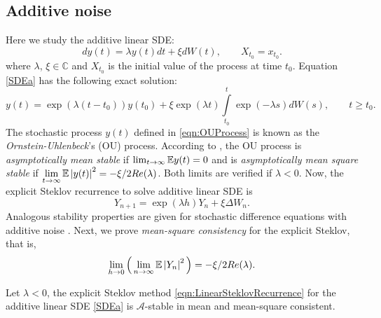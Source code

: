 		\subsection{Additive noise}
		Here we study the additive linear SDE: 
		\begin{equation}\label{SDEa}
			dy(t)=\lambda y(t)dt+ \xi  dW(t) , \qquad X_{t_0}=x_{t_0}.		
		\end{equation}
		where $\lambda$, $\xi \in \mathbb{C}$ and $X_{t_0}$ is the initial value of the process
		at time $t_0$. Equation \eqref{SDEa}  has  the following  exact solution:
	\begin{equation}\label{eqn:OUProcess}
		y(t)=\exp(\lambda (t-t_0)) y(t_0)+\xi 
		\exp(\lambda t)\int\limits_{t_0}^{t}\exp(-\lambda s)dW(s), 
		\qquad t\geq t_0.
	\end{equation}
	The stochastic process $y(t)$ defined in \eqref{eqn:OUProcess} is known as 
	the {\it Ornstein-Uhlenbeck}'s (OU)  process. According to \cite{Hernandez1992},
	the OU process  is {\it asymptotically mean stable} if
		$ \lim_{t\to\infty}\mathbb{E}y(t)=0$ and is
	{\it  asymptotically  mean square stable} if
	$\displaystyle \lim_{t\to\infty}\mathbb{E}\left|y(t)\right|^2=-\xi/2Re(\lambda)$. Both 
	limits are verified if $\lambda<0$. Now, the explicit 
	Steklov recurrence  to solve additive linear SDE is
	\begin{equation}\label{eqn:LinearSteklovRecurrence}
		Y_{n+1} =\exp(\lambda h)Y_n+\xi \Delta W_n.
	\end{equation}
	Analogous stability properties are given for 
	stochastic  difference equations with additive noise \cite{SaiotoPreprint}. 
	Next, we  prove {\it mean-square consistency} for the explicit Steklov, 
	that is, $$\lim_{h\to 0}\Big(\lim_{n\to\infty} \mathbb{E}\left|Y_n\right|^2\Big)=-\xi/2Re(\lambda).$$ 
%
	\begin{pro}
		Let $\lambda<0$, the explicit Steklov method  
		\eqref{eqn:LinearSteklovRecurrence} for the additive linear SDE \eqref{SDEa}
		is  $\mathcal{A}$-stable in mean and  mean-square consistent.	
	\end{pro}
